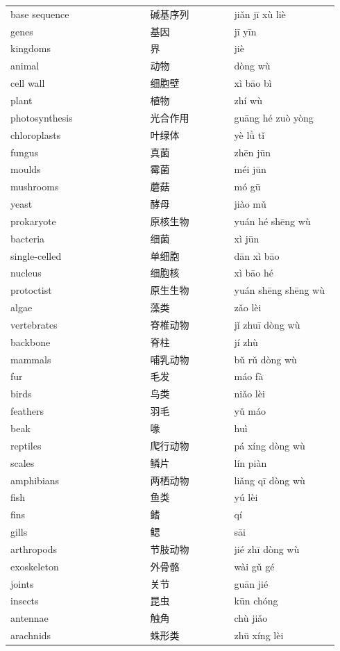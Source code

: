 \documentclass[11pt]{article}
\begin{document}
\begin{longtable}{@{}p{0.40\linewidth}p{0.24\linewidth}p{0.30\linewidth}@{}}
base sequence & 碱基序列 & jiǎn jī xù liè \\
genes & 基因 & jī yīn \\
kingdoms & 界 & jiè \\
animal & 动物 & dòng wù \\
cell wall & 细胞壁 & xì bāo bì \\
plant & 植物 & zhí wù \\
photosynthesis & 光合作用 & guāng hé zuò yòng \\
chloroplasts & 叶绿体 & yè lǜ tǐ \\
fungus & 真菌 & zhēn jūn \\
moulds & 霉菌 & méi jūn \\
mushrooms & 蘑菇 & mó gū \\
yeast & 酵母 & jiào mǔ \\
prokaryote & 原核生物 & yuán hé shēng wù \\
bacteria & 细菌 & xì jūn \\
single-celled & 单细胞 & dān xì bāo \\
nucleus & 细胞核 & xì bāo hé \\
protoctist & 原生生物 & yuán shēng shēng wù \\
algae & 藻类 & zǎo lèi \\
vertebrates & 脊椎动物 & jǐ zhuī dòng wù \\
backbone & 脊柱 & jí zhù \\
mammals & 哺乳动物 & bǔ rǔ dòng wù \\
fur & 毛发 & máo fà \\
birds & 鸟类 & niǎo lèi \\
feathers & 羽毛 & yǔ máo \\
beak & 喙 & huì \\
reptiles & 爬行动物 & pá xíng dòng wù \\
scales & 鳞片 & lín piàn \\
amphibians & 两栖动物 & liǎng qī dòng wù \\
fish & 鱼类 & yú lèi \\
fins & 鳍 & qí \\
gills & 鳃 & sāi \\
arthropods & 节肢动物 & jié zhī dòng wù \\
exoskeleton & 外骨骼 & wài gǔ gé \\
joints & 关节 & guān jié \\
insects & 昆虫 & kūn chóng \\
antennae & 触角 & chù jiǎo \\
arachnids & 蛛形类 & zhū xíng lèi \\

\end{longtable}
\end{document}
